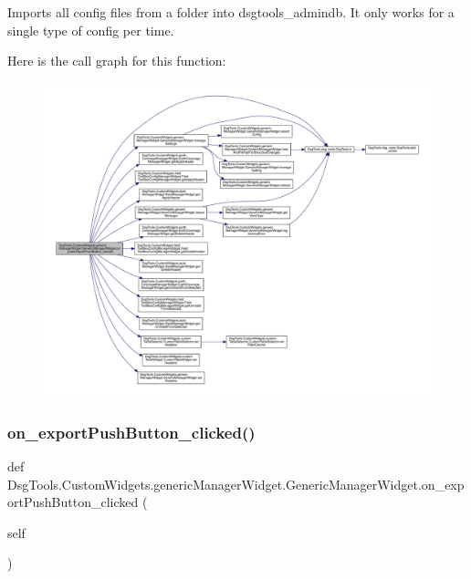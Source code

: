 \begin{DoxyVerb}Imports all config files from a folder into dsgtools_admindb. It only works for a single type of config per time.
\end{DoxyVerb}
 Here is the call graph for this function\+:
\nopagebreak
\begin{figure}[H]
\begin{center}
\leavevmode
\includegraphics[width=350pt]{class_dsg_tools_1_1_custom_widgets_1_1generic_manager_widget_1_1_generic_manager_widget_a986b7c861f25a0f793bddcc987d0250b_cgraph}
\end{center}
\end{figure}
\mbox{\label{class_dsg_tools_1_1_custom_widgets_1_1generic_manager_widget_1_1_generic_manager_widget_a03c3450d4471ef41da30f2d87c110d34}} 
\subsubsection{\texorpdfstring{on\+\_\+export\+Push\+Button\+\_\+clicked()}{on\_exportPushButton\_clicked()}}
{\footnotesize\ttfamily def Dsg\+Tools.\+Custom\+Widgets.\+generic\+Manager\+Widget.\+Generic\+Manager\+Widget.\+on\+\_\+export\+Push\+Button\+\_\+clicked (\begin{DoxyParamCaption}\item[{}]{self }\end{DoxyParamCaption})}

